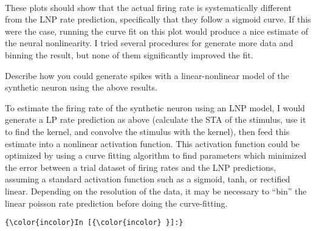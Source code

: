 \documentclass{article}
\begin{document}
    \begin{center}
    \end{center}
    { \hspace*{\fill} \\}
    
    These plots should show that the actual firing rate is systematically
different from the LNP rate prediction, specifically that they follow a
sigmoid curve. If this were the case, running the curve fit on this plot
would produce a nice estimate of the neural nonlinearity. I tried
several procedures for generate more data and binning the result, but
none of them significantly improved the fit.

    Describe how you could generate spikes with a linear-nonlinear model of
the synthetic neuron using the above results.

    To estimate the firing rate of the synthetic neuron using an LNP model,
I would generate a LP rate prediction as above (calculate the STA of the
stimulus, use it to find the kernel, and convolve the stimulus with the
kernel), then feed this estimate into a nonlinear activation function.
This activation function could be optimized by using a curve fitting
algorithm to find parameters which minimized the error between a trial
dataset of firing rates and the LNP predictions, assuming a standard
activation function such as a sigmoid, tanh, or rectified linear.
Depending on the resolution of the data, it may be necessary to ``bin''
the linear poisson rate prediction before doing the curve-fitting.

    \begin{Verbatim}[commandchars=\\\{\}]
{\color{incolor}In [{\color{incolor} }]:} 
\end{Verbatim}


    
    
    
    
\end{document}
